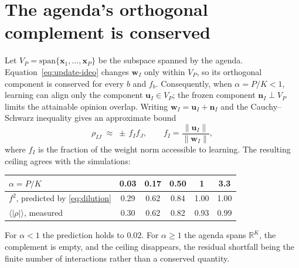 \documentclass{article}
\newcommand{\fb}{f_{b}}
\begin{document}
\section{The agenda's orthogonal complement is conserved}
\label{app:conserved}

Let $V_P=\mathrm{span}\{\mathbf{x}_1,\dots,\mathbf{x}_P\}$ be the subspace spanned by the
agenda. Equation~\eqref{eq:update-ideo} changes $\mathbf{w}_I$ only within $V_P$, so its
orthogonal component is conserved for every $b$ and $\fb$. Consequently, when
$\alpha=P/K<1$, learning can align only the component $\mathbf{u}_I\in V_P$; the frozen
component $\mathbf{n}_I\perp V_P$ limits the attainable opinion overlap. Writing
$\mathbf{w}_I=\mathbf{u}_I+\mathbf{n}_I$ and the Cauchy--Schwarz inequality gives an approximate bound
%
\begin{equation}
  \rho_{IJ} \;\approx\; \pm\, f_I f_J,
  \qquad f_I = \frac{\|\mathbf{u}_I\|}{\|\mathbf{w}_I\|},
  \label{eq:dilution}
\end{equation}
%
where $f_I$ is the fraction of the weight norm accessible to learning. The resulting
ceiling agrees with the simulations:

\begin{table}[H]
\centering\small
\begin{tabular}{lccccc}
\toprule
$\alpha = P/K$ & 0.03 & 0.17 & 0.50 & 1 & 3.3 \\
\midrule
$f^{2}$, predicted by \eqref{eq:dilution} & 0.29 & 0.62 & 0.84 & 1.00 & 1.00 \\
$\langle|\rho|\rangle$, measured            & 0.30 & 0.62 & 0.82 & 0.93 & 0.99 \\
\bottomrule
\end{tabular}
\end{table}

For $\alpha<1$ the prediction holds to $0.02$. For $\alpha\ge1$ the agenda spans
$\mathbb{R}^{K}$, the complement is empty, and the ceiling disappears, the residual
shortfall being the finite number of interactions rather than a conserved quantity.
\end{document}
